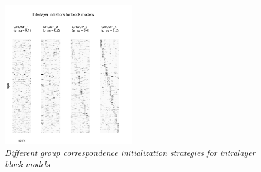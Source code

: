 \begin{figure}[H]
    \centering
    \includegraphics[width=0.5\textwidth,center]{../figures/report/FigS2.pdf}
    \caption{\label{supp:2}
    \textit{Different group correspondence initialization strategies for intralayer block models}
    }
\end{figure}